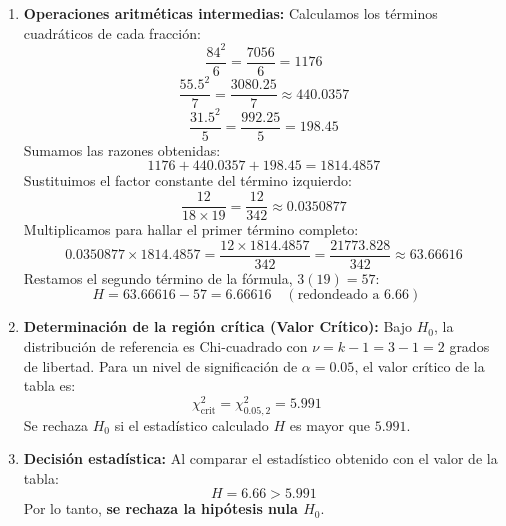 \documentclass[11pt,a4paper]{article}
\begin{document}
\begin{enumerate}
    \item \textbf{Operaciones aritméticas intermedias:}
    Calculamos los términos cuadráticos de cada fracción:
    \[ \frac{84^2}{6} = \frac{7056}{6} = 1176 \]
    \[ \frac{55.5^2}{7} = \frac{3080.25}{7} \approx 440.0357 \]
    \[ \frac{31.5^2}{5} = \frac{992.25}{5} = 198.45 \]
    Sumamos las razones obtenidas:
    \[ 1176 + 440.0357 + 198.45 = 1814.4857 \]
    Sustituimos el factor constante del término izquierdo:
    \[ \frac{12}{18 \times 19} = \frac{12}{342} \approx 0.0350877 \]
    Multiplicamos para hallar el primer término completo:
    \[ 0.0350877 \times 1814.4857 = \frac{12 \times 1814.4857}{342} = \frac{21773.828}{342} \approx 63.66616 \]
    Restamos el segundo término de la fórmula, $3(19) = 57$:
    \[ H = 63.66616 - 57 = 6.66616 \quad (\text{redondeado a } 6.66) \quad \]

    \item \textbf{Determinación de la región crítica (Valor Crítico):}
    Bajo $H_0$, la distribución de referencia es Chi-cuadrado con $\nu = k-1 = 3-1 = 2$ grados de libertad. Para un nivel de significación de $\alpha = 0.05$, el valor crítico de la tabla es:
    \[ \chi^2_{\text{crit}} = \chi^2_{0.05, 2} = 5.991 \quad \]
    Se rechaza $H_0$ si el estadístico calculado $H$ es mayor que $5.991$.

    \item \textbf{Decisión estadística:}
    Al comparar el estadístico obtenido con el valor de la tabla:
    \[ H = 6.66 > 5.991 \]
    Por lo tanto, \textbf{se rechaza la hipótesis nula $H_0$}.

    \begin{figure}[htbp]
    \centering
\end{figure}
\end{enumerate}
\end{document}
